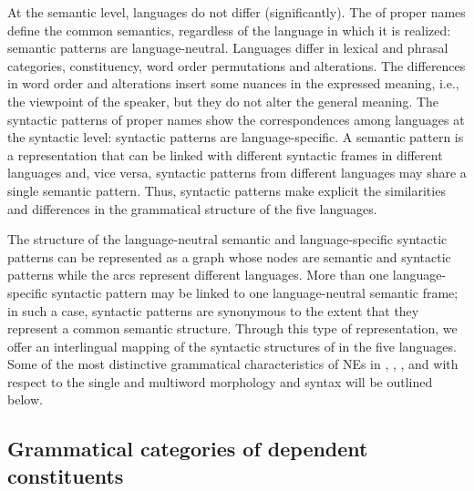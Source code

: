 \documentclass[output=paper]{langsci/langscibook}
\begin{document}
At the semantic level, languages do not differ (significantly). The
 of proper names define the common semantics,
regardless of the language in which it is realized: semantic patterns
are language-neutral. Languages differ in lexical and phrasal
categories, constituency, word order permutations and alterations. The
differences in word order and alterations insert some nuances in the
expressed meaning, i.e., the viewpoint of the speaker, but they do not
alter the general meaning. The syntactic patterns of proper names show
the correspondences among languages at the syntactic level: syntactic
patterns are language-specific. A semantic pattern is a representation
that can be linked with different syntactic frames in different
languages and, vice versa, syntactic patterns from different languages
may share a single semantic pattern. Thus, syntactic patterns make
explicit the similarities and differences in the grammatical structure
of the five languages.



The structure of the language-neutral semantic and language-specific
syntactic patterns can be represented as a graph whose nodes are
semantic and syntactic patterns while the arcs represent different
languages. More than one language-specific syntactic pattern may be
linked to one language-neutral semantic frame; in such a case,
syntactic patterns are synonymous to the extent that they represent a
common semantic structure. Through this type of representation, we
offer an interlingual mapping of the syntactic structures of  in the five languages. Some of the most distinctive
grammatical characteristics of NEs in , , , 
and  with respect to the single and multiword morphology and
syntax will be outlined below.

\subsection{Grammatical categories of dependent constituents} %
\end{document}

